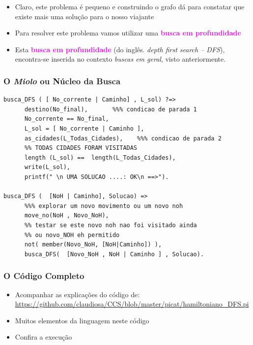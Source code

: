 \begin{frame}[fragile, allowframebreaks=0.9]
\begin{itemize}
\item Claro, este problema é pequeno e construindo o grafo dá para constatar que existe
mais uma solução para o nosso viajante

  \item Para resolver este problema vamos utilizar uma \textbf{\textcolor{magenta}{busca em profundidade}}
  
  \item Esta \textbf{\textcolor{magenta}{busca em profundidade}}  (do inglês. \textit{depth first search -- DFS}), 
  encontra-se inserida no contexto \textit{buscas em geral},
  visto anteriormente.
\end{itemize}


\end{frame}

\begin{frame}[fragile]
 \frametitle{O \textit{Miolo} ou Núcleo  da Busca}

\begin{footnotesize}
\begin{verbatim}
busca_DFS ( [ No_corrente | Caminho] , L_sol) ?=>
      destino(No_final),       %%% condicao de parada 1
      No_corrente == No_final,
      L_sol = [ No_corrente | Caminho ],
      as_cidades(L_Todas_Cidades),    %%% condicao de parada 2
      %% TODAS CIDADES FORAM VISITADAS
      length (L_sol) ==  length(L_Todas_Cidades),
      write(L_sol),
      printf(" \n UMA SOLUCAO ....: OK\n ==>"). 

busca_DFS (  [NoH | Caminho], Solucao) =>
      %%% explorar um novo movimento ou um novo noh
      move_no(NoH , Novo_NoH), 
      %% testar se este novo noh nao foi visitado ainda
      %% ou novo_NOH eh permitido
      not( member(Novo_NoH, [NoH|Caminho]) ),
      busca_DFS(  [Novo_NoH , NoH | Caminho ] , Solucao).
\end{verbatim}
\end{footnotesize}

\end{frame}


\begin{frame}[fragile]
 \frametitle{O Código Completo}

\begin{itemize}
  \item Acompanhar as explicações do código de:\\
\url{https://github.com/claudiosa/CCS/blob/master/picat/hamiltoniano_DFS.pi}

   \item Muitos elementos da linguagem neste código

  \item Confira a execução
\end{itemize}
\end{frame}




